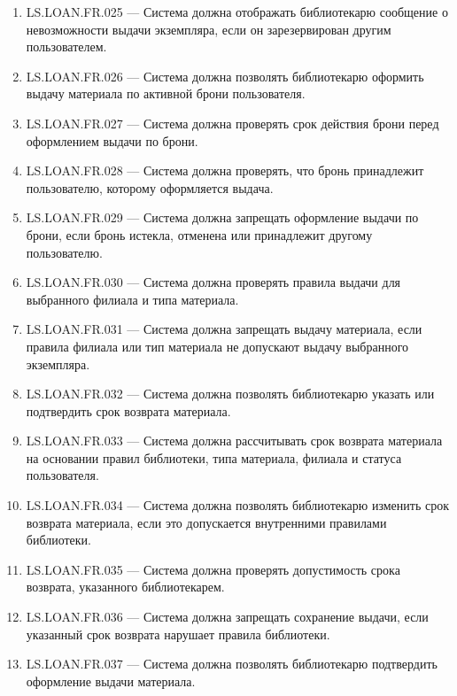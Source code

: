 \documentclass[12pt,a4paper]{article}
\begin{document}
\begin{enumerate}
		\item LS.LOAN.FR.025 --- Система должна отображать библиотекарю сообщение о
		невозможности выдачи экземпляра, если он зарезервирован другим пользователем.
		
		\item LS.LOAN.FR.026 --- Система должна позволять библиотекарю оформить выдачу
		материала по активной брони пользователя.
		
		\item LS.LOAN.FR.027 --- Система должна проверять срок действия брони перед
		оформлением выдачи по брони.
		
		\item LS.LOAN.FR.028 --- Система должна проверять, что бронь принадлежит
		пользователю, которому оформляется выдача.
		
		\item LS.LOAN.FR.029 --- Система должна запрещать оформление выдачи по брони,
		если бронь истекла, отменена или принадлежит другому пользователю.
		
		\item LS.LOAN.FR.030 --- Система должна проверять правила выдачи для выбранного
		филиала и типа материала.
		
		\item LS.LOAN.FR.031 --- Система должна запрещать выдачу материала, если правила
		филиала или тип материала не допускают выдачу выбранного экземпляра.
		
		\item LS.LOAN.FR.032 --- Система должна позволять библиотекарю указать или
		подтвердить срок возврата материала.
		
		\item LS.LOAN.FR.033 --- Система должна рассчитывать срок возврата материала на
		основании правил библиотеки, типа материала, филиала и статуса пользователя.
		
		\item LS.LOAN.FR.034 --- Система должна позволять библиотекарю изменить срок
		возврата материала, если это допускается внутренними правилами библиотеки.
		
		\item LS.LOAN.FR.035 --- Система должна проверять допустимость срока возврата,
		указанного библиотекарем.
		
		\item LS.LOAN.FR.036 --- Система должна запрещать сохранение выдачи, если
		указанный срок возврата нарушает правила библиотеки.
		
		\item LS.LOAN.FR.037 --- Система должна позволять библиотекарю подтвердить
		оформление выдачи материала.
		

\end{enumerate}
\end{document}
